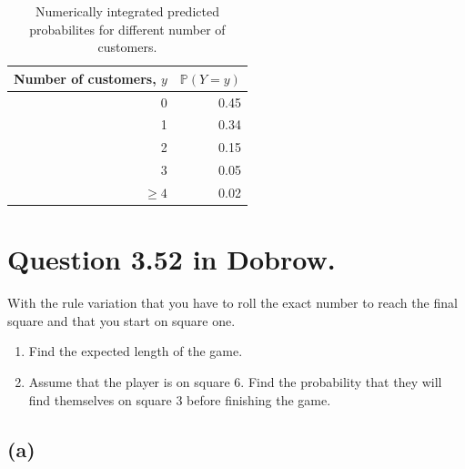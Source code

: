 \documentclass{article}
\begin{document}
\begin{table}
	\caption{Numerically integrated predicted probabilites for different number of customers. \label{tab:num_pred_prob}}
	\centering
	\begin{tabular}{r r}
		\toprule
		\multicolumn{1}{c}{\bfseries Number of customers, $y$} & \multicolumn{1}{c}{$\mathbb P(Y = y)$} \\
		\midrule
		0 & 0.45 \\
		1 & 0.34 \\
		2 & 0.15 \\
		3 & 0.05 \\
		$\ge 4$ & 0.02 \\
		\bottomrule
	\end{tabular}
\end{table}
\afterpage{\clearpage}

\section{Question \num{3.52} in Dobrow.}
With the rule variation that you have to roll the exact number to reach
the final square and that you start on square one.
\begin{enumerate}[label=(\alph*)]
	\item Find the expected length of the game.
	\item Assume that the player is on square 6.
		Find the probability that they will find themselves on square 3 before finishing the game.
\end{enumerate}

\subsection{(a)}
\end{document}
